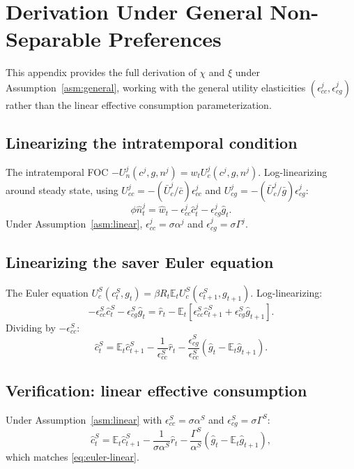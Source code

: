 \section{Derivation Under General Non-Separable Preferences}\label{app:general-nonsep}

This appendix provides the full derivation of $\chi$ and $\xi$ under
Assumption~\ref{asm:general}, working with the general utility elasticities
$(\epsilon^{j}_{cc},\epsilon^{j}_{cg})$ rather than the linear effective
consumption parameterization.

\subsection{Linearizing the intratemporal condition}\label{app:intra-general}
The intratemporal FOC $-U^{j}_{n}(c^{j},g,n^{j})=w_{t}U^{j}_{c}(c^{j},g,n^{j})$.
Log-linearizing around steady state, using
$U^{j}_{cc}=-(\bar U^{j}_{c}/\bar c)\epsilon^{j}_{cc}$ and
$U^{j}_{cg}=-(\bar U^{j}_{c}/\bar g)\epsilon^{j}_{cg}$:
\begin{equation}\label{eq:C-intra}
  \phi\hat n^{j}_{t}=\hat w_{t}-\epsilon^{j}_{cc}\hat c^{j}_{t}-\epsilon^{j}_{cg}\hat g_{t}.
\end{equation}
Under Assumption~\ref{asm:linear}, $\epsilon^{j}_{cc}=\sigma\alpha^{j}$ and
$\epsilon^{j}_{cg}=\sigma\Gamma^{j}$.

\subsection{Linearizing the saver Euler equation}\label{app:euler-general}
The Euler equation $U^{S}_{c}(c^{S}_{t},g_{t})=\beta R_{t}\mathbb{E}_{t}U^{S}_{c}(c^{S}_{t+1},g_{t+1})$.
Log-linearizing:
\[
  -\epsilon^{S}_{cc}\hat c^{S}_{t}-\epsilon^{S}_{cg}\hat g_{t}
  =\hat r_{t}-\mathbb{E}_{t}[\epsilon^{S}_{cc}\hat c^{S}_{t+1}+\epsilon^{S}_{cg}\hat g_{t+1}].
\]
Dividing by $-\epsilon^{S}_{cc}$:
\begin{equation}\label{eq:C-euler}
  \hat c^{S}_{t}=\mathbb{E}_{t}\hat c^{S}_{t+1}-\frac{1}{\epsilon^{S}_{cc}}\hat r_{t}
  -\frac{\epsilon^{S}_{cg}}{\epsilon^{S}_{cc}}(\hat g_{t}-\mathbb{E}_{t}\hat g_{t+1}).
\end{equation}

\subsection{Verification: linear effective consumption}\label{app:verify-linear}
Under Assumption~\ref{asm:linear} with $\epsilon^{S}_{cc}=\sigma\alpha^{S}$
and $\epsilon^{S}_{cg}=\sigma\Gamma^{S}$:
\[
  \hat c^{S}_{t}=\mathbb{E}_{t}\hat c^{S}_{t+1}-\frac{1}{\sigma\alpha^{S}}\hat r_{t}
    -\frac{\Gamma^{S}}{\alpha^{S}}(\hat g_{t}-\mathbb{E}_{t}\hat g_{t+1}),
\]
which matches \eqref{eq:euler-linear}.

